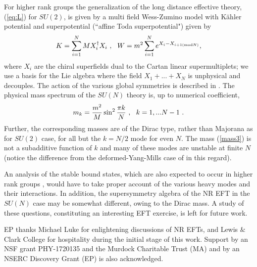 \documentclass[11pt]{article}
\begin{document}
 For higher rank groups the  generalization of the long distance effective theory,  (\ref{eq:L}) for $SU(2)$, is given by a multi field Wess-Zumino model with  K\" ahler potential  and superpotential   (``affine Toda superpotential") given by
 \begin{equation}
 \label{sun}  K = \sum\limits_{i=1}^N M X_i^\dagger X_i~,~~ W = m^2\sum\limits_{i=1}^N e^{X_i - X_{i+1({\rm mod}N)}},
 \end{equation} where $X_i$ are the chiral superfields dual to the Cartan linear supermultiplets; we use a basis for the Lie algebra where the field $X_1 + ... + X_N$ is unphysical and decouples. The action of the various global symmetries is described in \cite{Anber:2015wha,Cherman:2016jtu}.  The physical mass spectrum of the $SU(N)$ theory is, up to numerical coefficient,   
 \begin{equation} \label{mass3}
 m_k  = {m^2 \over M} \sin^2 {\pi k \over N} ~, ~~k=1,...N-1~.
 \end{equation} Further, the corresponding masses are of the Dirac type, rather than Majorana as for $SU(2)$ case, for all but the $k=N/2$ mode for even $N$. The  mass (\ref{mass3}) is not a subadditive function of $k$ and many of these modes are unstable at finite $N$ (notice the difference from the deformed-Yang-Mills case of  \cite{Aitken:2017ayq} in this regard).
 
  An analysis of the stable bound states, which are also expected to occur in higher rank groups \cite{Aitken:2017ayq}, would have to take proper account of the various heavy modes and their interactions. In addition, the supersymmetry algebra of the NR EFT in the $SU(N)$ case may be somewhat different, owing to the Dirac mass. A study of these questions, constituting an interesting EFT exercise, is left for future work. 

\acknowledgments

EP thanks Michael Luke  for enlightening discussions of NR EFTs, and Lewis $\&$ Clark College for hospitality during the initial stage of this work. Support by an NSF grant PHY-1720135 and the Murdock Charitable Trust (MA) and by an NSERC Discovery Grant (EP) is also acknowledged.


\appendix


\end{document}
